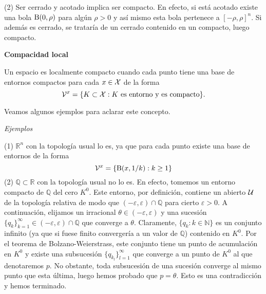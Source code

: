 \begin{itemize}
\begin{obs}
(2) Ser cerrado y acotado implica ser compacto. En efecto, si está acotado existe una bola $\operatorname{B}(0,\rho)$ para algún $\rho >0$ y así mismo esta bola pertenece a $[-\rho,\rho]^n$. Si además es cerrado, se trataría de un cerrado contenido en un compacto, luego compacto. 
\end{obs}

\textbf{Compacidad local}

\begin{defi} Un espacio es localmente compacto cuando cada punto tiene una base de entornos compactos para cada $x\in \mathcal{X}$ de la forma 
\[\mathcal{V}^x=\{K\subset \mathcal{X}: K\text{ es entorno y es compacto}\}.\]
\end{defi}

Veamos algunos ejemplos para aclarar este concepto. 

\textit{Ejemplos}

(1) $\mathbb{R}^n$ con la topología usual lo es, ya que para cada punto existe una base de entornos de la forma
\[\mathcal{V}^x=\{\operatorname{B}(x,1/k):k\geq 1\}\]
(2) $\mathbb{Q}\subset \mathbb{R}$ con la topología usual no lo es. En efecto, tomemos un entorno compacto de $\mathbb{Q}$ del cero $K^0$. Este entorno, por definición, contiene un abierto $\mathcal{U}$ de la topología relativa de modo que $(-\varepsilon,\varepsilon)\cap \mathbb{Q}$ para cierto $\varepsilon>0$. A continuación, elijamos un irracional $\theta \in (-\varepsilon,\varepsilon)$ y una sucesión $\{q_k\}_{k=1}^\infty\in (-\varepsilon,\varepsilon)\cap \mathbb{Q}$ que converge a $\theta$. Claramente, $\{q_k:k\in \mathbb{N}\}$ es un conjunto infinito (ya que si fuese finito convergería a un valor de $\mathbb{Q}$) contenido en $K^0$. Por el teorema de Bolzano-Weierstrass, este conjunto tiene un punto de acumulación en $K^0$ y existe una subsucesión $\{q_{k_l}\}_{l=1}^\infty$ que converge a un punto de $K^0$ al que denotaremos $p$. No obstante, toda subsucesión de una sucesión converge al mismo punto que esta última, luego hemos probado que $p=\theta$. Esto es una contradicción y hemos terminado. 
\end{itemize}